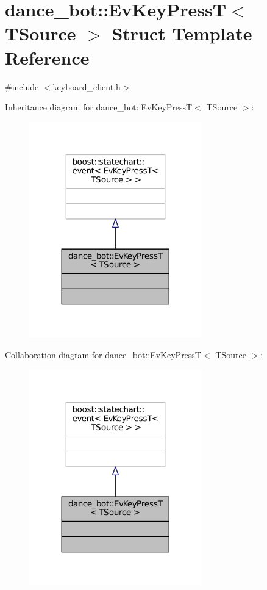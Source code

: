 \hypertarget{structdance__bot_1_1EvKeyPressT}{}\section{dance\+\_\+bot\+:\+:Ev\+Key\+PressT$<$ T\+Source $>$ Struct Template Reference}
\label{structdance__bot_1_1EvKeyPressT}


{\ttfamily \#include $<$keyboard\+\_\+client.\+h$>$}



Inheritance diagram for dance\+\_\+bot\+:\+:Ev\+Key\+PressT$<$ T\+Source $>$\+:
\nopagebreak
\begin{figure}[H]
\begin{center}
\leavevmode
\includegraphics[width=212pt]{structdance__bot_1_1EvKeyPressT__inherit__graph}
\end{center}
\end{figure}


Collaboration diagram for dance\+\_\+bot\+:\+:Ev\+Key\+PressT$<$ T\+Source $>$\+:
\nopagebreak
\begin{figure}[H]
\begin{center}
\leavevmode
\includegraphics[width=212pt]{structdance__bot_1_1EvKeyPressT__coll__graph}
\end{center}
\end{figure}


